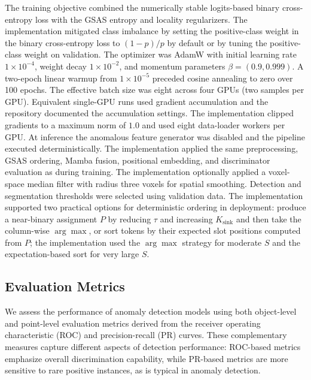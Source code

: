 The training objective combined the numerically stable logits-based binary cross-entropy loss with the GSAS entropy and locality regularizers. The implementation mitigated class imbalance by setting the positive-class weight in the binary cross-entropy loss to \((1-p)/p\) by default or by tuning the positive-class weight on validation. The optimizer was AdamW with initial learning rate \(1\times 10^{-4}\), weight decay \(1\times 10^{-2}\), and momentum parameters \(\beta=(0.9,0.999)\). A two-epoch linear warmup from \(1\times 10^{-5}\) preceded cosine annealing to zero over 100 epochs. The effective batch size was eight across four GPUs (two samples per GPU). Equivalent single-GPU runs used gradient accumulation and the repository documented the accumulation settings. The implementation clipped gradients to a maximum norm of \(1.0\) and used eight data-loader workers per GPU. At inference the anomalous feature generator was disabled and the pipeline executed deterministically. The implementation applied the same preprocessing, GSAS ordering, Mamba fusion, positional embedding, and discriminator evaluation as during training. The implementation optionally applied a voxel-space median filter with radius three voxels for spatial smoothing. Detection and segmentation thresholds were selected using validation data. The implementation supported two practical options for deterministic ordering in deployment: produce a near-binary assignment \(P\) by reducing \(\tau\) and increasing \(K_{\mathrm{sink}}\) and then take the column-wise \(\arg\max\), or sort tokens by their expected slot positions computed from \(P\); the implementation used the \(\arg\max\) strategy for moderate \(S\) and the expectation-based sort for very large \(S\).

\subsection{Evaluation Metrics}

We assess the performance of anomaly detection models using both object-level and point-level evaluation metrics derived from the receiver operating characteristic (ROC) and precision-recall (PR) curves. These complementary measures capture different aspects of detection performance: ROC-based metrics emphasize overall discrimination capability, while PR-based metrics are more sensitive to rare positive instances, as is typical in anomaly detection.


